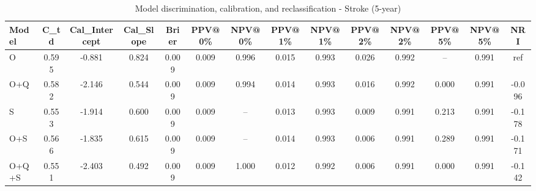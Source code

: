 \begin{table}[htbp]
\centering
\small
\caption{Model discrimination, calibration, and reclassification - Stroke (5-year)}
\label{tab:perf_stroke_5y}
\begin{tabular}{lccccccccccccc}
\toprule
Model & C\_td & Cal\_Intercept & Cal\_Slope & Brier & PPV@0\% & NPV@0\% & PPV@1\% & NPV@1\% & PPV@2\% & NPV@2\% & PPV@5\% & NPV@5\% & NRI \\
\midrule
O & 0.595 & -0.881 & 0.824 & 0.009 & 0.009 & 0.996 & 0.015 & 0.993 & 0.026 & 0.992 & -- & 0.991 & ref \\
O+Q & 0.582 & -2.146 & 0.544 & 0.009 & 0.009 & 0.994 & 0.014 & 0.993 & 0.016 & 0.992 & 0.000 & 0.991 & -0.096 \\
S & 0.553 & -1.914 & 0.600 & 0.009 & 0.009 & -- & 0.013 & 0.993 & 0.009 & 0.991 & 0.213 & 0.991 & -0.178 \\
O+S & 0.566 & -1.835 & 0.615 & 0.009 & 0.009 & -- & 0.014 & 0.993 & 0.006 & 0.991 & 0.289 & 0.991 & -0.171 \\
O+Q+S & 0.551 & -2.403 & 0.492 & 0.009 & 0.009 & 1.000 & 0.012 & 0.992 & 0.006 & 0.991 & 0.000 & 0.991 & -0.142 \\
\bottomrule
\end{tabular}
\end{table}